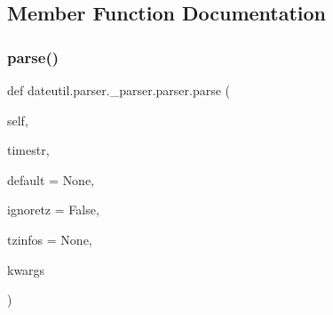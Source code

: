 \subsection{Member Function Documentation}
\mbox{\label{classdateutil_1_1parser_1_1__parser_1_1parser_a9059296e66c19d8e7ba26fe2418f50d1}} 
\subsubsection{\texorpdfstring{parse()}{parse()}}
{\footnotesize\ttfamily def dateutil.\+parser.\+\_\+parser.\+parser.\+parse (\begin{DoxyParamCaption}\item[{}]{self,  }\item[{}]{timestr,  }\item[{}]{default = {\ttfamily None},  }\item[{}]{ignoretz = {\ttfamily False},  }\item[{}]{tzinfos = {\ttfamily None},  }\item[{}]{kwargs }\end{DoxyParamCaption})}


